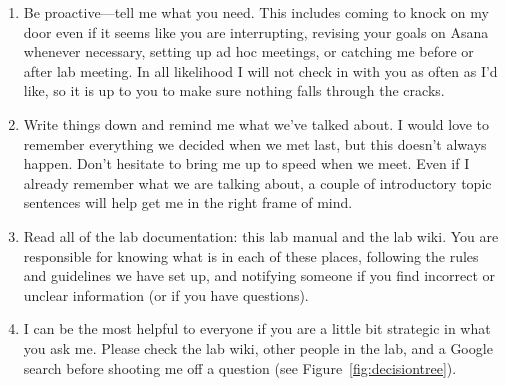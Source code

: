 \documentclass[letterpaper,11pt,oneside]{memoir}
\begin{document}
\begin{enumerate}
\item Be proactive---tell me what you need. This includes coming to knock on my door even if it seems like you are interrupting, revising your goals on Asana whenever necessary, setting up ad hoc meetings, or catching me before or after lab meeting. In all likelihood I will not check in with you as often as I'd like, so it is up to you to make sure nothing falls through the cracks.
\item Write things down and remind me what we've talked about. I would love to remember everything we decided when we met last, but this doesn't always happen. Don't hesitate to bring me up to speed when we meet. Even if I already remember what we are talking about, a couple of introductory topic sentences will help get me in the right frame of mind.
\item Read all of the lab documentation: this lab manual and the lab wiki. You are responsible for knowing what is in each of these places, following the rules and guidelines we have set up, and notifying someone if you find incorrect or unclear information (or if you have questions).
\item I can be the most helpful to everyone if you are a little bit strategic in what you ask me. Please check the lab wiki, other people in the lab, and a Google search before shooting me off a question (see Figure~\ref{fig:decisiontree}).
\end{enumerate}
\end{document}
